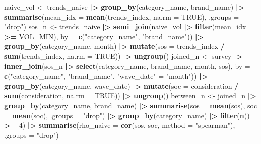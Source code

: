 \documentclass[
]{article}
\newenvironment{Shaded}{\begin{snugshade}}{\end{snugshade}}
\newcommand{\AttributeTok}[1]{\textcolor[rgb]{0.13,0.29,0.53}{#1}}
\newcommand{\ConstantTok}[1]{\textcolor[rgb]{0.56,0.35,0.01}{#1}}
\newcommand{\DecValTok}[1]{\textcolor[rgb]{0.00,0.00,0.81}{#1}}
\newcommand{\FunctionTok}[1]{\textcolor[rgb]{0.13,0.29,0.53}{\textbf{#1}}}
\newcommand{\NormalTok}[1]{#1}
\newcommand{\OtherTok}[1]{\textcolor[rgb]{0.56,0.35,0.01}{#1}}
\newcommand{\SpecialCharTok}[1]{\textcolor[rgb]{0.81,0.36,0.00}{\textbf{#1}}}
\newcommand{\StringTok}[1]{\textcolor[rgb]{0.31,0.60,0.02}{#1}}
\begin{document}
\begin{Shaded}
\begin{Highlighting}[]
\NormalTok{naive\_vol }\OtherTok{\textless{}{-}}\NormalTok{ trends\_naive }\SpecialCharTok{|\textgreater{}}
  \FunctionTok{group\_by}\NormalTok{(category\_name, brand\_name) }\SpecialCharTok{|\textgreater{}}
  \FunctionTok{summarise}\NormalTok{(}\AttributeTok{mean\_idx =} \FunctionTok{mean}\NormalTok{(trends\_index, }\AttributeTok{na.rm =} \ConstantTok{TRUE}\NormalTok{), }\AttributeTok{.groups =} \StringTok{"drop"}\NormalTok{)}
\NormalTok{sos\_n }\OtherTok{\textless{}{-}}\NormalTok{ trends\_naive }\SpecialCharTok{|\textgreater{}}
  \FunctionTok{semi\_join}\NormalTok{(naive\_vol }\SpecialCharTok{|\textgreater{}} \FunctionTok{filter}\NormalTok{(mean\_idx }\SpecialCharTok{\textgreater{}=}\NormalTok{ VOL\_MIN),}
            \AttributeTok{by =} \FunctionTok{c}\NormalTok{(}\StringTok{"category\_name"}\NormalTok{, }\StringTok{"brand\_name"}\NormalTok{)) }\SpecialCharTok{|\textgreater{}}
  \FunctionTok{group\_by}\NormalTok{(category\_name, month) }\SpecialCharTok{|\textgreater{}}
  \FunctionTok{mutate}\NormalTok{(}\AttributeTok{sos =}\NormalTok{ trends\_index }\SpecialCharTok{/} \FunctionTok{sum}\NormalTok{(trends\_index, }\AttributeTok{na.rm =} \ConstantTok{TRUE}\NormalTok{)) }\SpecialCharTok{|\textgreater{}}
  \FunctionTok{ungroup}\NormalTok{()}
\NormalTok{joined\_n }\OtherTok{\textless{}{-}}\NormalTok{ survey }\SpecialCharTok{|\textgreater{}}
  \FunctionTok{inner\_join}\NormalTok{(sos\_n }\SpecialCharTok{|\textgreater{}} \FunctionTok{select}\NormalTok{(category\_name, brand\_name, month, sos),}
             \AttributeTok{by =} \FunctionTok{c}\NormalTok{(}\StringTok{"category\_name"}\NormalTok{, }\StringTok{"brand\_name"}\NormalTok{, }\StringTok{"wave\_date"} \OtherTok{=} \StringTok{"month"}\NormalTok{)) }\SpecialCharTok{|\textgreater{}}
  \FunctionTok{group\_by}\NormalTok{(category\_name, wave\_date) }\SpecialCharTok{|\textgreater{}}
  \FunctionTok{mutate}\NormalTok{(}\AttributeTok{soc =}\NormalTok{ consideration }\SpecialCharTok{/} \FunctionTok{sum}\NormalTok{(consideration, }\AttributeTok{na.rm =} \ConstantTok{TRUE}\NormalTok{)) }\SpecialCharTok{|\textgreater{}}
  \FunctionTok{ungroup}\NormalTok{()}
\NormalTok{between\_n }\OtherTok{\textless{}{-}}\NormalTok{ joined\_n }\SpecialCharTok{|\textgreater{}}
  \FunctionTok{group\_by}\NormalTok{(category\_name, brand\_name) }\SpecialCharTok{|\textgreater{}}
  \FunctionTok{summarise}\NormalTok{(}\AttributeTok{sos =} \FunctionTok{mean}\NormalTok{(sos), }\AttributeTok{soc =} \FunctionTok{mean}\NormalTok{(soc), }\AttributeTok{.groups =} \StringTok{"drop"}\NormalTok{) }\SpecialCharTok{|\textgreater{}}
  \FunctionTok{group\_by}\NormalTok{(category\_name) }\SpecialCharTok{|\textgreater{}} \FunctionTok{filter}\NormalTok{(}\FunctionTok{n}\NormalTok{() }\SpecialCharTok{\textgreater{}=} \DecValTok{4}\NormalTok{) }\SpecialCharTok{|\textgreater{}}
  \FunctionTok{summarise}\NormalTok{(}\AttributeTok{rho\_naive =} \FunctionTok{cor}\NormalTok{(sos, soc, }\AttributeTok{method =} \StringTok{"spearman"}\NormalTok{), }\AttributeTok{.groups =} \StringTok{"drop"}\NormalTok{)}


\end{Highlighting}
\end{Shaded}
\end{document}
